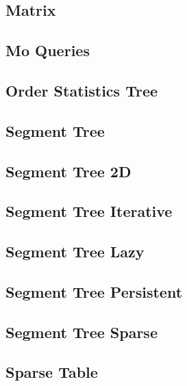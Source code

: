 \subsection{Matrix}
\raggedbottom
\hrulefill
\subsection{Mo Queries}
\raggedbottom
\hrulefill
\subsection{Order Statistics Tree}
\raggedbottom
\hrulefill
\subsection{Segment Tree}
\raggedbottom
\hrulefill
\subsection{Segment Tree 2D}
\raggedbottom
\hrulefill
\subsection{Segment Tree Iterative}
\raggedbottom
\hrulefill
\subsection{Segment Tree Lazy}
\raggedbottom
\hrulefill
\subsection{Segment Tree Persistent}
\raggedbottom
\hrulefill
\subsection{Segment Tree Sparse}
\raggedbottom
\hrulefill
\subsection{Sparse Table}
\raggedbottom
\hrulefill

